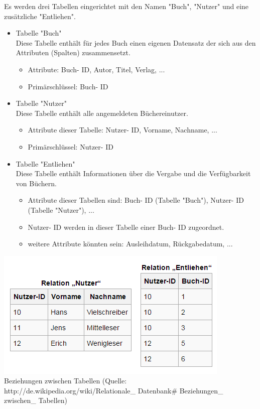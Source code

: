 \documentclass[12pt,a4paper]{report}
\begin{document}
\begin{onehalfspace}
Es werden drei Tabellen eingerichtet mit den Namen "{}Buch"{}, "{}Nutzer"{} und eine zusätzliche "{}Entliehen"{}.
\begin{itemize}
\item Tabelle "{}Buch"{}\\
Diese Tabelle enthält für jedes Buch einen eigenen Datensatz der sich aus den Attributen (Spalten) zusammensetzt.
\begin{itemize}
\item Attribute: Buch- ID, Autor, Titel, Verlag, ...
\item Primärschlüssel: Buch- ID
\end{itemize}
\item Tabelle "{}Nutzer"{}\\
Diese Tabelle enthält alle angemeldeten Büchereinutzer.
\begin{itemize}
\item Attribute dieser Tabelle: Nutzer- ID, Vorname, Nachname, ...
\item Primärschlüssel: Nutzer- ID
\end{itemize}
\item Tabelle "{}Entliehen"{}\\
Diese Tabelle enthält Informationen über die Vergabe und die Verfügbarkeit von Büchern.
\begin{itemize}
\item Attribute dieser Tabellen sind: Buch- ID (Tabelle "{}Buch"{}), Nutzer- ID (Tabelle "{}Nutzer"{}), ...
\item Nutzer- ID werden in dieser Tabelle einer Buch- ID zugeordnet.
\item weitere Attribute könnten sein: Ausleihdatum, Rückgabedatum, ...
\end{itemize}
\end{itemize}

\begin{center}
\includegraphics[scale=0.8]{img/tabellen.png}\\
Beziehungen zwischen Tabellen (Quelle: http://de.wikipedia.org/wiki/Relationale\_ Datenbank\# Beziehungen\_ zwischen\_ Tabellen)
\end{center}


\end{onehalfspace}
\end{document}
